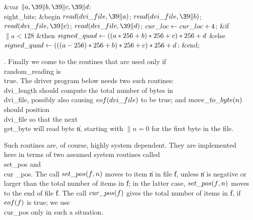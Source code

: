 \4\&{var} $\|a,\39\|b,\39\|c,\39\|d$: \\{eight\_bits};\2\6
\&{begin} $\\{read}(\\{dvi\_file},\39\|a)$;\5
$\\{read}(\\{dvi\_file},\39\|b)$;\5
$\\{read}(\\{dvi\_file},\39\|c)$;\5
$\\{read}(\\{dvi\_file},\39\|d)$;\5
$\\{cur\_loc}\K\\{cur\_loc}+4$;\6
\&{if} $\|a<128$ \1\&{then}\5
$\\{signed\_quad}\K((\|a\ast256+\|b)\ast256+\|c)\ast256+\|d$\6
\4\&{else} $\\{signed\_quad}\K(((\|a-256)\ast256+\|b)\ast256+\|c)\ast256+\|d$;%
\2\6
\&{end};\par
\fi

. Finally we come to the routines that are used only if \\{random\_reading}
is
\\{true}. The driver program below needs two such routines: \\{dvi\_length}
should
compute the total number of bytes in \\{dvi\_file}, possibly also
causing $\\{eof}(\\{dvi\_file})$ to be true; and $\\{move\_to\_byte}(\|n)$
should position \\{dvi\_file} so that the next \\{get\_byte} will read byte %
\|n,
starting with $\|n=0$ for the first byte in the file.

Such routines are, of course, highly system dependent. They are implemented
here in terms of two assumed system routines called \\{set\_pos} and \\{cur%
\_pos}.
The call $\\{set\_pos}(\|f,\|n)$ moves to item \|n in file \|f, unless \|n is
negative or larger than the total number of items in \|f; in the latter
case, $\\{set\_pos}(\|f,\|n)$ moves to the end of file \|f.
The call $\\{cur\_pos}(\|f)$ gives the total number of items in \|f, if
$\\{eof}(\|f)$ is true; we use \\{cur\_pos} only in such a situation.


